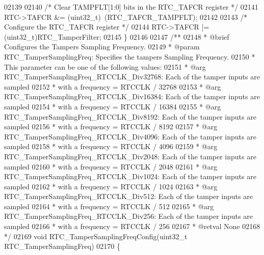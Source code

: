 \begin{DoxyCode}
02139 
02140   \textcolor{comment}{/* Clear TAMPFLT[1:0] bits in the RTC\_TAFCR register */}
02141   RTC->TAFCR &= (uint32\_t)~(RTC_TAFCR_TAMPFLT);
02142 
02143   \textcolor{comment}{/* Configure the RTC\_TAFCR register */}
02144   RTC->TAFCR |= (uint32\_t)RTC\_TamperFilter;
02145 \}
02146 
02147 \textcolor{comment}{/**}
02148 \textcolor{comment}{  * @brief  Configures the Tampers Sampling Frequency.}
02149 \textcolor{comment}{  * @param  RTC\_TamperSamplingFreq: Specifies the tampers Sampling Frequency.}
02150 \textcolor{comment}{  *   This parameter can be one of the following values:}
02151 \textcolor{comment}{  *     @arg RTC\_TamperSamplingFreq\_RTCCLK\_Div32768: Each of the tamper inputs are sampled}
02152 \textcolor{comment}{  *                                           with a frequency =  RTCCLK / 32768}
02153 \textcolor{comment}{  *     @arg RTC\_TamperSamplingFreq\_RTCCLK\_Div16384: Each of the tamper inputs are sampled}
02154 \textcolor{comment}{  *                                           with a frequency =  RTCCLK / 16384}
02155 \textcolor{comment}{  *     @arg RTC\_TamperSamplingFreq\_RTCCLK\_Div8192: Each of the tamper inputs are sampled}
02156 \textcolor{comment}{  *                                           with a frequency =  RTCCLK / 8192}
02157 \textcolor{comment}{  *     @arg RTC\_TamperSamplingFreq\_RTCCLK\_Div4096: Each of the tamper inputs are sampled}
02158 \textcolor{comment}{  *                                           with a frequency =  RTCCLK / 4096}
02159 \textcolor{comment}{  *     @arg RTC\_TamperSamplingFreq\_RTCCLK\_Div2048: Each of the tamper inputs are sampled}
02160 \textcolor{comment}{  *                                           with a frequency =  RTCCLK / 2048}
02161 \textcolor{comment}{  *     @arg RTC\_TamperSamplingFreq\_RTCCLK\_Div1024: Each of the tamper inputs are sampled}
02162 \textcolor{comment}{  *                                           with a frequency =  RTCCLK / 1024}
02163 \textcolor{comment}{  *     @arg RTC\_TamperSamplingFreq\_RTCCLK\_Div512: Each of the tamper inputs are sampled}
02164 \textcolor{comment}{  *                                           with a frequency =  RTCCLK / 512  }
02165 \textcolor{comment}{  *     @arg RTC\_TamperSamplingFreq\_RTCCLK\_Div256: Each of the tamper inputs are sampled}
02166 \textcolor{comment}{  *                                           with a frequency =  RTCCLK / 256  }
02167 \textcolor{comment}{  * @retval None}
02168 \textcolor{comment}{  */}
02169 \textcolor{keywordtype}{void} RTC_TamperSamplingFreqConfig(uint32\_t RTC\_TamperSamplingFreq)
02170 \{

\end{DoxyCode}
